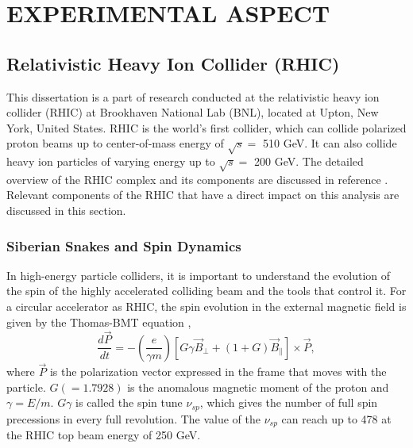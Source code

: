 \chapter{EXPERIMENTAL ASPECT}

\section{Relativistic Heavy Ion Collider (RHIC)}
This dissertation is a part of research conducted at the relativistic heavy ion collider (RHIC) at Brookhaven National Lab (BNL), located at Upton, New York, United States. RHIC is the world's first collider, which can collide polarized proton beams up to center-of-mass energy of $\sqrt{s} =$ 510 GeV. It can also collide heavy ion particles of varying energy up to $\sqrt{s} =$ 200 GeV. The detailed overview of the RHIC complex and its components are discussed in reference \cite{Alekseev:2003sk}. Relevant components of the RHIC that have a direct impact on this analysis are discussed in this section.   

   
\subsection{Siberian Snakes and Spin Dynamics}
\label{subsec:snakes}
In high-energy particle colliders, it is important to understand the evolution of the spin of the highly accelerated colliding beam and the tools that control it.  
For a circular accelerator as RHIC, the spin evolution in the external magnetic field is given by the Thomas-BMT equation \cite{Thomas:1927yu, Bargmann:1959gz},
\begin{equation}
    \frac{d\vec{P}}{dt} = -(\frac{e}{\gamma m})[G\gamma \vec{B}_\perp + (1+G)\vec{B}_\parallel]\times \vec{P},
\end{equation}
where $\vec{P}$ is the polarization vector expressed in the frame that moves with the particle. $G(=1.7928)$ is the anomalous magnetic moment of the proton and $\gamma = E/m$. $G\gamma$ is called the spin tune $\nu_{sp}$, which gives the number of full spin precessions in every full revolution. The value of the $\nu_{sp}$ can reach up to 478 at the RHIC top beam energy of 250 GeV. 

